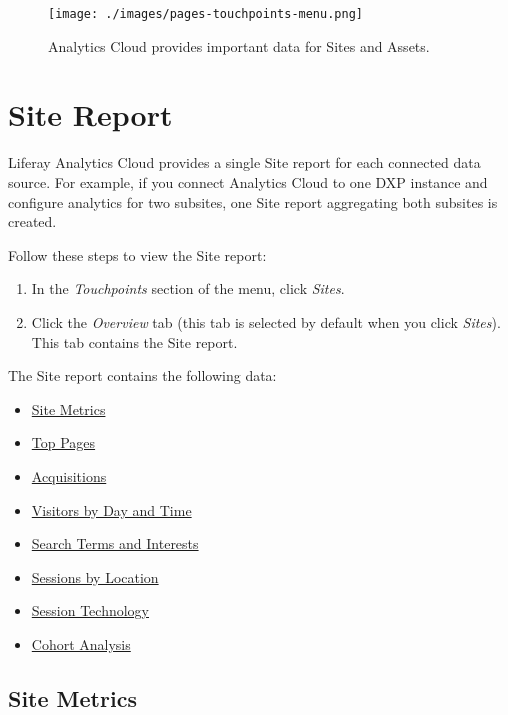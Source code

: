 \begin{figure}
\centering
\texttt{[image: ./images/pages-touchpoints-menu.png]}
\caption{Analytics Cloud provides important data for Sites and Assets.}
\end{figure}

\section{Site Report}\label{site-report}

Liferay Analytics Cloud provides a single Site report for each connected
data source. For example, if you connect Analytics Cloud to one DXP
instance and configure analytics for two subsites, one Site report
aggregating both subsites is created.

Follow these steps to view the Site report:

\begin{enumerate}
\def\labelenumi{\arabic{enumi}.}
\item
  In the \emph{Touchpoints} section of the menu, click \emph{Sites}.
\item
  Click the \emph{Overview} tab (this tab is selected by default when
  you click \emph{Sites}). This tab contains the Site report.
\end{enumerate}

The Site report contains the following data:

\begin{itemize}
\tightlist
\item
  \hyperref[site-metrics]{Site Metrics}
\item
  \hyperref[top-pages]{Top Pages}
\item
  \hyperref[acquisitions]{Acquisitions}
\item
  \hyperref[visitors-by-day-and-time]{Visitors by Day and Time}
\item
  \hyperref[search-terms-and-interests]{Search Terms and Interests}
\item
  \hyperref[sessions-by-location]{Sessions by Location}
\item
  \hyperref[session-technology]{Session Technology}
\item
  \hyperref[cohort-analysis]{Cohort Analysis}
\end{itemize}

\subsection{Site Metrics}\label{site-metrics}

